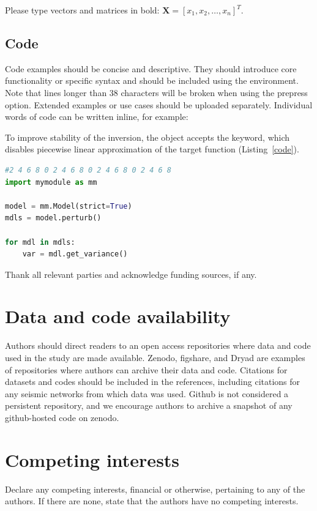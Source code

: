 \documentclass[breakmath]{seismica}
\begin{document}
	Please type vectors and matrices in bold: $\mathbf{X} = \left[x_1,x_2,\ldots,x_n \right]^T$.

	\subsection{Code}

    Code examples should be concise and descriptive. They should introduce core functionality or specific syntax and should be included using the  environment. Note that lines longer than 38 characters will be broken when using the prepress option. Extended examples or use cases should be uploaded separately. Individual words of code can be written inline, for example:

        To improve stability of the inversion, the  object accepts the  keyword, which disables piecewise linear approximation of the target function (Listing~\ref{code}).

        \begin{lstlisting}[caption=Example use of \code{Model}, label=code, language=Python]
#2 4 6 8 0 2 4 6 8 0 2 4 6 8 0 2 4 6 8
import mymodule as mm

model = mm.Model(strict=True)
mdls = model.perturb()

for mdl in mdls:
    var = mdl.get_variance()
\end{lstlisting}
	
	\begin{acknowledgements}
		Thank all relevant parties and acknowledge funding sources, if any.
	\end{acknowledgements}
	
	\section*{Data and code availability}
	Authors should direct readers to an open access repositories where data and code used in the study are made available. Zenodo, figshare, and Dryad are examples of repositories where authors can archive their data and code. Citations for datasets and codes should be included in the references, including citations for any seismic networks from which data was used. Github is not considered a persistent repository, and we encourage authors to archive a snapshot of any github-hosted code on zenodo.
	
        \section*{Competing interests}
        Declare any competing interests, financial or otherwise, pertaining to any of the authors. If there are none, state that the authors have no competing interests.

	
	
\end{document}
